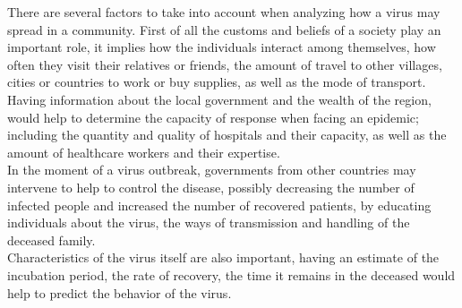 \begin{itemize}

There are several factors to take into account when analyzing how a virus may spread in a community. First of all the customs and beliefs of a society play an important role, it implies how the individuals interact among themselves, how often they visit their relatives or friends, the amount of travel to other villages, cities or countries to work or buy supplies, as well as the mode of transport.\\
Having information about the local government and the wealth of the region, would help to determine the capacity of response when facing an epidemic; including the quantity and quality of hospitals and their capacity, as well as the amount of healthcare workers and their expertise.\\
In the moment of a virus outbreak, governments from other countries may intervene to help to control the disease, possibly decreasing the number of infected people and increased the number of recovered patients, by educating individuals about the virus, the ways of transmission and handling of the deceased family. \\
Characteristics of the virus itself are also important, having an estimate of the incubation period, the rate of recovery, the time it remains in the deceased would help to predict the behavior of the virus.\\

\end{itemize}